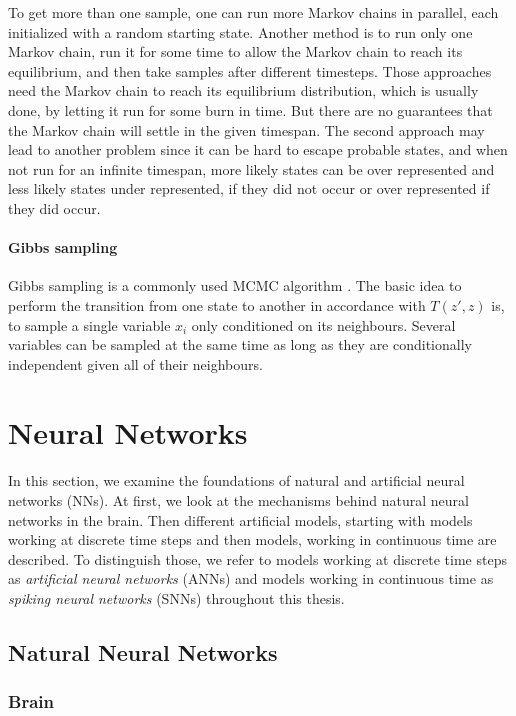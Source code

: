 To get more than one sample, one can run more Markov chains in parallel, each initialized with a random starting state. 
Another method is to run only one Markov chain, run it for some time to allow the Markov chain to reach its equilibrium, and then take samples after different timesteps.
Those approaches need the Markov chain to reach its equilibrium distribution, which is usually done, by letting it run for some burn in time.
But there are no guarantees that the Markov chain will settle in the given timespan.    
The second approach may lead to another problem since it can be hard to escape probable states, and when not run for an infinite timespan, more likely states can be over represented and less likely states under represented, if they did not occur or over represented if they did occur.  

\paragraph{Gibbs sampling} Gibbs sampling is a commonly used MCMC algorithm \cite{Goodfellow-et-al-2016-Book}. The basic idea to perform the transition from one state to another in accordance with $T(z',z)$ is, to sample a single variable $x_i$ only conditioned on its neighbours. 
Several variables can be sampled at the same time as long as they are conditionally independent given all of their neighbours.

\section{Neural Networks} \label{c:NNs}

In this section, we examine the foundations of natural and artificial neural networks (NNs).
At first, we look at the mechanisms behind natural neural networks in the brain.
Then different artificial models, starting with models working at discrete time steps and then models, working in continuous time are described.
To distinguish those, we refer to models working at discrete time steps as \textit{artificial neural networks} (ANNs) and models working in continuous time as \textit{spiking neural networks} (SNNs) throughout this thesis.

\subsection{Natural Neural Networks} \label{c:natural}
\subsubsection{Brain} \label{c:brain}

